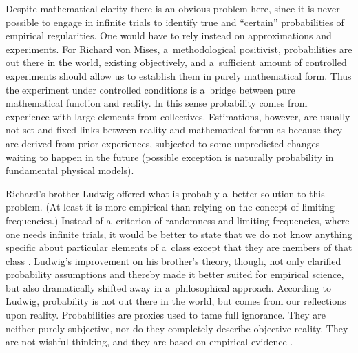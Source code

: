 Despite mathematical clarity there is an obvious problem here, since it is never possible to engage in infinite trials to identify true and ``certain'' probabilities of empirical regularities. One would have to rely instead on approximations and experiments. For Richard von Mises, a~methodological positivist, probabilities are out there in the world, existing objectively, and a~sufficient amount of controlled experiments should allow us to establish them in purely mathematical form. Thus the experiment under controlled conditions is a~bridge between pure mathematical function and reality. In this sense probability comes from experience with large elements from collectives. Estimations, however, are usually not set and fixed links between reality and mathematical formulas because they are derived from prior experiences, subjected to some unpredicted changes waiting to happen in the future (possible exception is naturally probability in fundamental physical models).



Richard's brother Ludwig offered what is probably a~better solution to this problem. (At least it is more empirical than relying on the concept of limiting frequencies.) Instead of a~criterion of randomness and limiting frequencies, where one needs infinite trials, it would be better to state that we do not know anything specific about particular elements of a~class except that they are members of that class 
\parencite[][p.109]{mises_human_1966}. %
 Ludwig's improvement on his brother's theory, though, not only clarified probability assumptions and thereby made it better suited for empirical science, but also dramatically shifted away in a~philosophical approach. According to Ludwig, probability is not out there in the world, but comes from our reflections upon reality. Probabilities are proxies used to tame full ignorance. They are neither purely subjective, nor do they completely describe objective reality. They are not wishful thinking, and they are based on empirical evidence 
\parencite[][p.233]{moser_foundations_1988}.%




